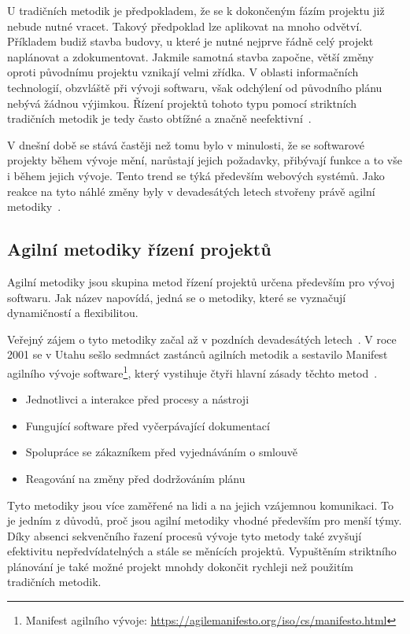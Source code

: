 U tradičních metodik je předpokladem, že se k dokončeným fázím projektu již nebude nutné vracet. Takový předpoklad lze aplikovat na mnoho odvětví. Příkladem budiž stavba budovy, u které je nutné nejprve řádně celý projekt naplánovat a zdokumentovat. Jakmile samotná stavba započne, větší změny oproti původnímu projektu vznikají velmi zřídka. V oblasti informačních technologií, obzvláště při vývoji softwaru, však odchýlení od původního plánu nebývá žádnou výjimkou. Řízení projektů tohoto typu pomocí striktních tradičních metodik je tedy často obtížné a značně neefektivní~\cite{bib:agile-vs-traditional-what}.

V dnešní době se stává častěji než tomu bylo v minulosti, že se softwarové projekty během vývoje mění, narůstají jejich požadavky, přibývají funkce a to vše i během jejich vývoje. Tento trend se týká především webových systémů. Jako reakce na tyto náhlé změny byly v devadesátých letech stvořeny právě agilní metodiky~\cite{bib:agile-history}. 

\subsection{Agilní metodiky řízení projektů}
Agilní metodiky jsou skupina metod řízení projektů určena především pro vývoj softwaru. Jak název napovídá, jedná se o metodiky, které se vyznačují dynamičností a flexibilitou.

Veřejný zájem o tyto metodiky začal až v pozdních devadesátých letech~\cite{bib:agile-mobile}. V roce 2001 se v Utahu sešlo sedmnáct zastánců agilních metodik a sestavilo Manifest agilního vývoje software\footnote{ Manifest agilního vývoje: \url{https://agilemanifesto.org/iso/cs/manifesto.html}}, který vystihuje čtyři hlavní zásady těchto metod~\cite{bib:agile-manifest}.
\begin{itemize}
  \item Jednotlivci a interakce před procesy a nástroji
  \item Fungující software před vyčerpávající dokumentací
  \item Spolupráce se zákazníkem před vyjednáváním o smlouvě
  \item Reagování na změny před dodržováním plánu
\end{itemize}

Tyto metodiky jsou více zaměřené na lidi a na jejich vzájemnou komunikaci. To je jedním z důvodů, proč jsou agilní metodiky vhodné především pro menší týmy. Díky absenci sekvenčního řazení procesů vývoje tyto metody také zvyšují efektivitu nepředvídatelných a stále se měnících projektů. Vypuštěním striktního plánování je také možné projekt mnohdy dokončit rychleji než použitím tradičních metodik.


